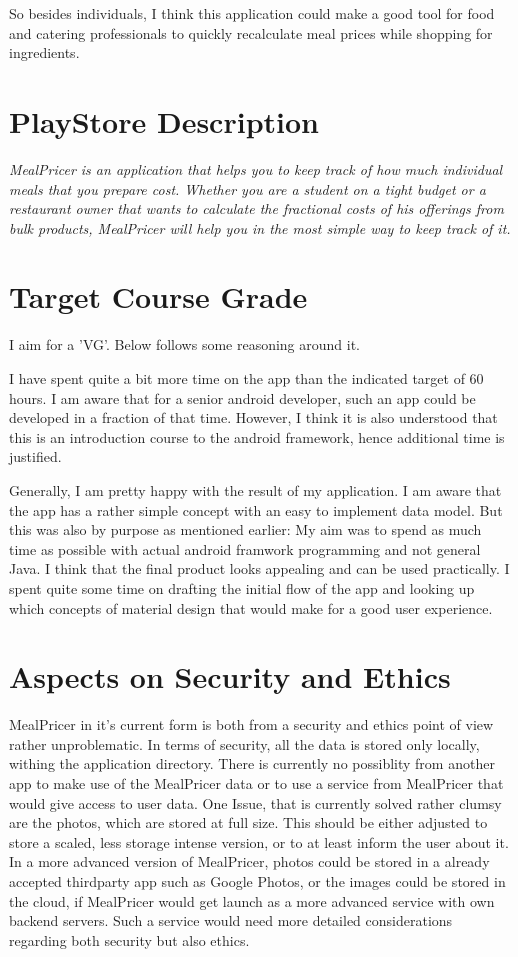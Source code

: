 \documentclass[a4paper,11pt,twoside]{article}
\begin{document}
So besides individuals, I think this application could make a good tool for
food and catering professionals to quickly recalculate meal prices while
shopping for ingredients.

\section{PlayStore Description}
\textit{MealPricer is an application that helps you to keep track of how much individual
meals that you prepare cost. Whether you are a student on a tight budget or a
restaurant owner that wants to calculate the fractional costs of his offerings
from bulk products, MealPricer will help you in the most simple way to keep track
of it.}

\section{Target Course Grade}
I aim for a 'VG'. Below follows some reasoning around it.

I have spent quite a bit more time on the app than the indicated
target of 60 hours. I am aware that for a senior android developer, such an
app could be developed in a fraction of that time. However, I think it is
also understood that this is an introduction course to the android framework, hence
additional time is justified.

Generally, I am pretty happy with the result of my application. I am aware that
the app has a rather simple concept with an easy to implement data model. But this
was also by purpose as mentioned earlier: My aim was to spend as much time as
possible with actual android framwork programming and not general Java. I think that
the final product looks appealing and can be used practically. I spent quite some
time on drafting the initial flow of the app and looking up which concepts of
material design that would make for a good user experience.



\section{Aspects on Security and Ethics}
MealPricer in it's current form is both from a security and ethics point of
view rather unproblematic. In terms of security, all the data is stored only
locally, withing the application directory. There is currently no possiblity
from another app to make use of the MealPricer data or to use a service from
MealPricer that would give access to user data.
One Issue, that is currently solved rather clumsy are the photos, which are
stored at full size. This should be either adjusted to store a scaled, less
storage intense version, or to at least inform the user about it. In a more
advanced version of MealPricer, photos could be stored in a already accepted
thirdparty app such as Google Photos, or the images could be stored in the
cloud, if MealPricer would get launch as a more advanced service with own
backend servers. Such a service would need more detailed considerations regarding
both security but also ethics.
\end{document}
